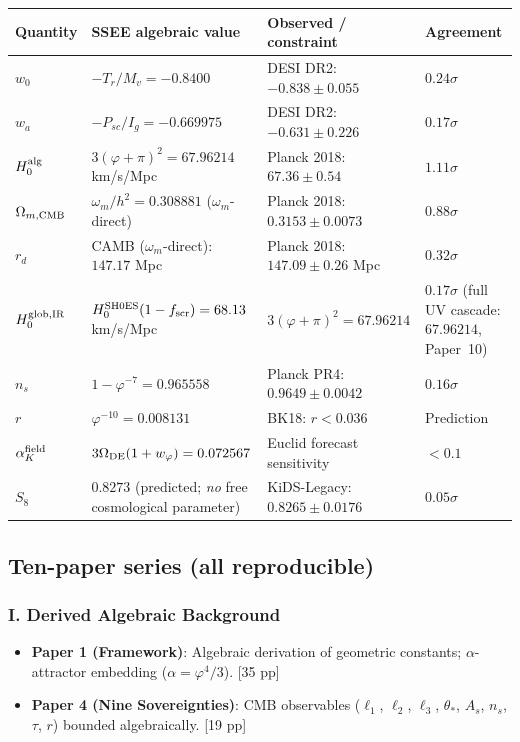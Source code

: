 \documentclass[11pt,a4paper]{article}
\begin{document}
\begin{center}
\begin{tabular}{llll}
\toprule
\textbf{Quantity} & \textbf{SSEE algebraic value} & \textbf{Observed / constraint} & \textbf{Agreement} \\
\midrule
$w_0$ & $-T_r/M_v = -0.8400$ & DESI DR2: $-0.838\pm0.055$ & $0.24\sigma$ \\
$w_a$ & $-P_{sc}/I_g = -0.669975$ & DESI DR2: $-0.631\pm0.226$ & $0.17\sigma$ \\
$H_0^{\rm alg}$ & $3(\varphi+\pi)^2 = 67.96214$ km/s/Mpc & Planck 2018: $67.36\pm0.54$ & $1.11\sigma$ \\
$\Omega_{m,\rm CMB}$ & $\omega_m/h^2 = 0.308881$ ($\omega_m$-direct) & Planck 2018: $0.3153\pm0.0073$ & $0.88\sigma$ \\
$r_d$ & CAMB ($\omega_m$-direct): $147.17$ Mpc & Planck 2018: $147.09\pm0.26$ Mpc & $0.32\sigma$ \\
$H_0^{\rm glob,IR}$ & $H_0^{\rm SH0ES}(1-f_{\rm scr}) = 68.13$ km/s/Mpc & $3(\varphi+\pi)^2 = 67.96214$ & $0.17\sigma$ (full UV cascade: $67.96214$, Paper~10) \\
$n_s$ & $1-\varphi^{-7} = 0.965558$ & Planck PR4: $0.9649\pm0.0042$ & $0.16\sigma$ \\
$r$ & $\varphi^{-10} = 0.008131$ & BK18: $r<0.036$ & Prediction \\
$\alpha_K^{\rm field}$ & $3\Omega_{\rm DE}(1+w_\varphi) = 0.072567$ & Euclid forecast sensitivity & $<0.1$ \\
$S_8$ & $0.8273$ (predicted; \emph{no} free cosmological parameter) & KiDS-Legacy: $0.8265\pm0.0176$ & $0.05\sigma$ \\
\bottomrule
\end{tabular}
\end{center}

\subsection*{Ten-paper series (all reproducible)}

\subsubsection*{I. Derived Algebraic Background}
\begin{itemize}
  \item \textbf{Paper 1 (Framework)}: Algebraic derivation of geometric constants; $\alpha$-attractor embedding ($\alpha=\varphi^4/3$). [35 pp]
  \item \textbf{Paper 4 (Nine Sovereignties)}: CMB observables ($\ell_1$, $\ell_2$, $\ell_3$, $\theta_*$, $A_s$, $n_s$, $\tau$, $r$) bounded algebraically. [19 pp]
\end{itemize}
\end{document}
